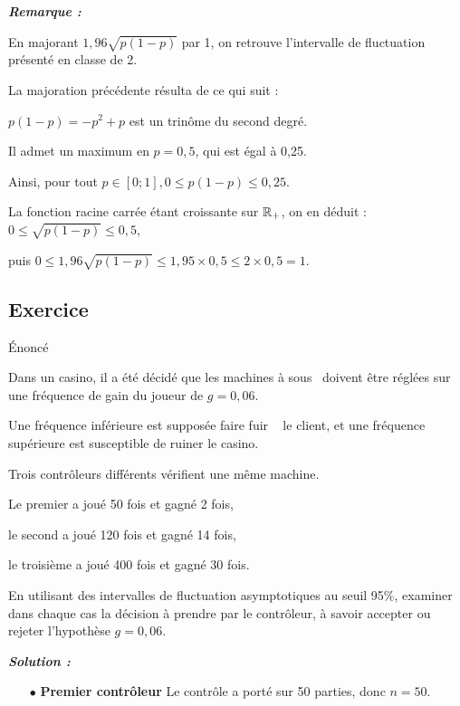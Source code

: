 \begin{spacing}{1.2}
\textbf{\textit{Remarque :}}

En majorant $1,96\sqrt{p(1-p)}$ par 1, on retrouve l'intervalle de fluctuation présenté en classe de 2.

La majoration précédente résulta de ce qui suit :

$p(1-p)=-p^2+p$ est un trinôme du second degré.

Il admet un maximum en $p=0,5$, qui est égal à 0,25.

Ainsi, pour tout $p\in [0;1], 0\leq p(1-p)\leq 0,25$.

La fonction racine carrée étant croissante sur $\mathbb{R}_+$, on en déduit : $0\leq \sqrt{p(1-p)}\leq 0,5$, 

puis $0\leq 1,96\sqrt{p(1-p)}\leq 1,95\times 0,5\leq 2\times 0,5=1$.

\subsection{Exercice}

\begin{bclogo}[couleur = blue!30 , arrondi = 0.1 ,logo = \bclampe , barre = snake , tailleOndu = 1.5]{\'Enoncé}

Dans un casino, il a été décidé que les \og machines à sous\fg~ doivent être réglées sur une fréquence de gain du joueur de $g=0,06$.

Une fréquence inférieure est supposée faire \og fuir \fg~ le client, et une fréquence supérieure est susceptible de ruiner le casino.

Trois contrôleurs différents vérifient une même machine.

Le premier a joué 50 fois et gagné 2 fois,

le second a joué 120 fois et gagné 14 fois,

le troisième a joué 400 fois et gagné 30 fois.

En utilisant des intervalles de fluctuation asymptotiques au seuil 95\%, examiner dans chaque cas la décision à prendre par le contrôleur, à savoir accepter ou rejeter l'hypothèse $g=0,06$.
\end{bclogo}

\bigskip

\textbf{\textit{Solution :}}

\begin{itemize}
\item[$\bullet$] \textbf{Premier contrôleur}
Le contrôle a porté sur 50 parties, donc $n=50$.


\end{itemize}
\end{spacing}
